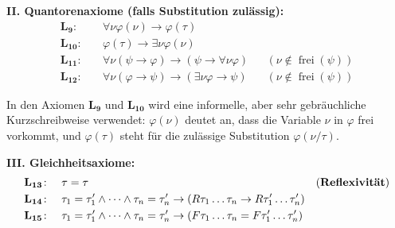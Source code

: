 \begin{math-stroke}
\textbf{II. Quantorenaxiome (falls Substitution zulässig):}
\begin{align}
    \mathbf{L_9}\colon &\quad \forall \nu \varphi(\nu) \rightarrow \varphi(\tau) \nonumber \\
    \mathbf{L_{10}}\colon &\quad \varphi(\tau) \rightarrow \exists \nu \varphi(\nu) \nonumber \\
    \mathbf{L_{11}}\colon &\quad \forall \nu (\psi \rightarrow \varphi) \rightarrow (\psi \rightarrow \forall \nu \varphi) && (\nu \notin \operatorname{frei}(\psi)) \nonumber \\
    \mathbf{L_{12}}\colon &\quad \forall \nu (\varphi \rightarrow \psi) \rightarrow (\exists \nu \varphi \rightarrow \psi) && (\nu \notin \operatorname{frei}(\psi)) \nonumber
\end{align}

\begin{explanation-of-steps}
In den Axiomen $\mathbf{L_9}$ und $\mathbf{L_{10}}$ wird eine informelle, aber sehr gebräuchliche Kurzschreibweise verwendet: $\varphi(\nu)$ deutet an, dass die Variable $\nu$ in $\varphi$ frei vorkommt, und $\varphi(\tau)$ steht für die zulässige Substitution $\varphi(\nu/\tau)$.
\end{explanation-of-steps}

\textbf{III. Gleichheitsaxiome:}
\begin{align}
    \mathbf{L_{13}}\colon &\quad \tau = \tau && \text{(\textbf{Reflexivität})} \nonumber \\
    \mathbf{L_{14}}\colon &\quad \tau_1 = \tau_1' \wedge \dots \wedge \tau_n = \tau_n' \rightarrow (R\tau_1 \dots \tau_n \rightarrow R\tau_1' \dots \tau_n') \nonumber \\
    \mathbf{L_{15}}\colon &\quad \tau_1 = \tau_1' \wedge \dots \wedge \tau_n = \tau_n' \rightarrow (F\tau_1 \dots \tau_n = F\tau_1' \dots \tau_n') \nonumber
\end{align}
\end{math-stroke}

